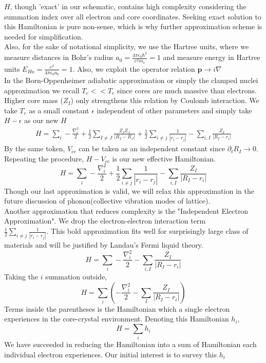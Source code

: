 \documentclass{article}
\begin{document}
$H$, though 'exact' in our schematic, contains high complexity considering the summation index over all electron and core coordinates. Seeking exact solution to this Hamiltonian is pure non-sense, which is why further approximation scheme is needed for simplification.\\
Also, for the sake of notational simplicity, we use the Hartree units, where we measure distances in Bohr's radius $a_0=\frac{4\pi\epsilon_0\hbar^2}{e^2m_e}=1$ and measure energy in Hartree units $E_{Ha}=\frac{e^2}{4\pi\epsilon_0a_0}=1$. Also, we exploit the operator relation $\mathbf{p}\to i\nabla$\\
In the Born-Oppenheimer adiabatic approximation or simply the clamped nuclei approximation we recall $T_{c}<<T_{e}$ since cores are much massive than electrons. Higher core mass ($Z_{I}$) only strengthens this relation by Coulomb interaction. We take $T_{c}$ as a small constant $\epsilon$  independent of other parameters and simply take $H-\epsilon$ as our new $H$
\begin{multline}
	H=\sum_{i}-\frac{\nabla_i^{2}}{2}+\frac{1}{2}\sum_{I\neq J}\frac{Z_{I}Z_{J}}{|R_{I}-R_{J}|}+
	\frac{1}{2}\sum_{i\neq j}\frac{1}{|r_{i}-r_{j}|}-\sum_{i,I}\frac{Z_{I}}{|R_{I}-r_{i}|}
\end{multline}
By the same token, $V_{cc}$ can be taken as an independent constant since $\partial_{t} R_{I}\to0$. Repeating the procedure, $H-V_{cc}$ is our new effective Hamiltonian.
\begin{equation}
	H=\sum_{i}-\frac{\nabla_i^{2}}{2}+\frac{1}{2}\sum_{i\neq j}\frac{1}{|r_{i}-r_{j}|}-\sum_{i,I}\frac{Z_{I}}{|R_{I}-r_{i}|}\label{themasterhamiltonian}
\end{equation}
Though our last approximation is valid, we will relax this approximation in the future discussion of phonon(collective vibration modes of lattice).\\
Another approximation that reduces complexity is the "Independent Electron Approximation". We drop the electron-electron interaction term \\
$\frac{1}{2}\sum_{i\neq j}\frac{1}{|r_{i}-r_{j}|}$. This bold approximation fits well for surprisingly large class of materials and will be justified by Landau's Fermi liquid theory.
\begin{equation}
	H=\sum_{i}-\frac{\nabla_i^{2}}{2}-\sum_{i,I}\frac{Z_{I}}{|R_{I}-r_{i}|}
\end{equation}
Taking the $i$ summation outside,
\begin{equation}
	H=\sum_{i}\left(-\frac{\nabla_i^{2}}{2}-\sum_{I}\frac{Z_{I}}{|R_{I}-r_{i}|}\right)
\end{equation}
Terms inside the parentheses is the Hamiltonian which a single electron experiences in the core-crystal environment. Denoting this Hamiltonian $h_{i}$,
\begin{equation}
	H=\sum_{i}h_{i}
\end{equation}
We have succeeded in reducing the Hamiltonian into a sum of Hamiltonian each individual electron experiences. Our initial interest is to survey this $h_{i}$
\end{document}
